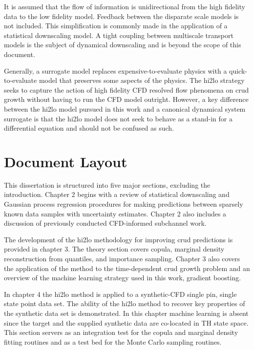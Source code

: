 
It is assumed that the flow of information is unidirectional from the high fidelity data to the low fidelity model.  Feedback between the disparate scale models is not included.  This simplification is commonly made in the application of a statistical downscaling model.  A tight coupling between multiscale transport models is the subject of dynamical downscaling and is beyond the scope of this document.

Generally, a surrogate model replaces expensive-to-evaluate physics with a quick-to-evaluate model that preserves some aspects of the physics. The hi2lo strategy seeks to capture the action of high fidelity CFD resolved flow phenomena on crud growth without having to run the CFD model outright.  However, a key difference between the hi2lo model pursued in this work and a canonical dynamical system surrogate is that the hi2lo model does not seek to behave as a stand-in for a differential equation and should not be confused as such.  


\section{Document Layout}

This dissertation is structured into five major sections, excluding the introduction.  Chapter 2 begins with a review of statistical downscaling and Gaussian process regression procedures for making predictions between sparsely known data samples with uncertainty estimates.  Chapter 2 also includes a discussion of previously conducted CFD-informed subchannel work. 

The development of the hi2lo methodology for improving crud predictions is provided in chapter 3.  The theory section covers copula, marginal density reconstruction from quantiles, and importance sampling.  Chapter 3 also covers the application of the method to the time-dependent crud growth problem and an overview of the machine learning strategy used in this work, gradient boosting.   

In chapter 4 the hi2lo method is applied to a synthetic-CFD single pin, single state point data set.  The ability of the hi2lo method to recover key properties of the synthetic data set is demonstrated.   In this chapter machine learning is absent since the target and the supplied synthetic data are co-located in TH state space.  This section servers as an integration test for the copula and marginal density fitting routines and as a test bed for the Monte Carlo sampling routines.

